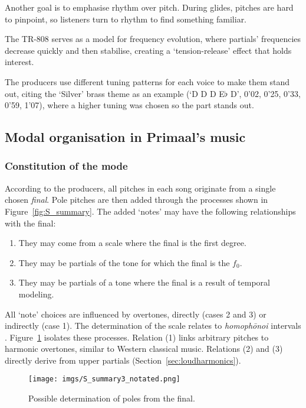 \documentclass{article}
\begin{document}
Another goal is to emphasise rhythm over pitch. During glides, pitches are hard to pinpoint, so listeners turn to rhythm to find something familiar.

The TR-808 serves as a model for frequency evolution, where partials' frequencies decrease quickly and then stabilise, creating a `tension-release' effect that holds interest. 

The producers use different tuning patterns for each voice to make them stand out, citing the `Silver' brass theme as an example (`D D D E$\flat$ D', 0'02, 0'25, 0'33, 0'59, 1'07), where a higher tuning was chosen so the part stands out.

	


\subsection{Modal organisation in Primaal's music}\label{sec:modality}

\subsubsection{Constitution of the mode}

According to the producers, all pitches in each song originate from a single chosen \emph{final}. Pole pitches are then added through the processes shown in Figure~\ref{fig:S_summary}. The added `notes' may have the following relationships with the final:

\begin{enumerate}[noitemsep]
	\item They may come from a scale where the final is the first degree.
	\item They may be partials of the tone for which the final is the $f_0$.
	\item They may be partials of a tone where the final is a result of temporal modeling.
\end{enumerate}

All `note' choices are influenced by overtones, directly (cases 2 and 3) or indirectly (case 1). The determination of the scale relates to \emph{homoph\={o}noi} intervals \citep{richter2001ptolemy}. Figure~\ref{fig:S_summary_notated} isolates these processes. Relation (1) links arbitrary pitches to harmonic overtones, similar to Western classical music. Relations (2) and (3) directly derive from upper partials (Section~\ref{sec:loudharmonics}).

\begin{figure}[htbp]
  \centering
  \texttt{[image: imgs/S\_summary3\_notated.png]}
  \caption{Possible determination of poles from the final.} 
\label{fig:S_summary_notated}
\end{figure}
\end{document}
